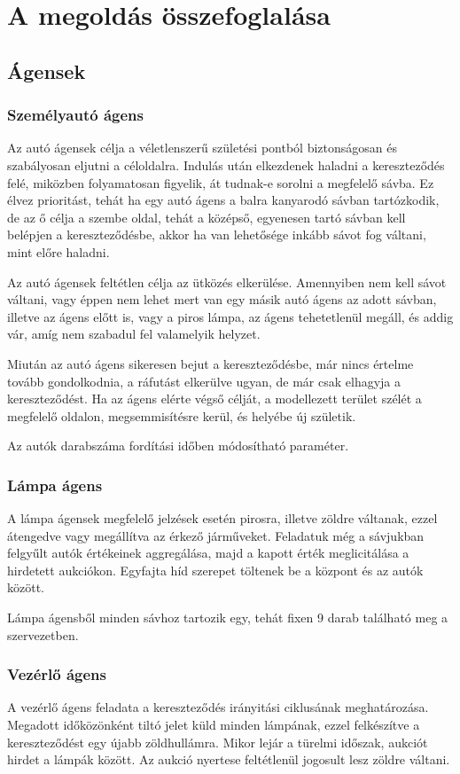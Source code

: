 \documentclass[a4paper, 11pt]{article}
\begin{document}
\section{A megoldás összefoglalása}
\subsection{Ágensek}
\subsubsection{Személyautó ágens}
Az autó ágensek célja a véletlenszerű születési pontból biztonságosan és szabályosan eljutni a céloldalra.
Indulás után elkezdenek haladni a kereszteződés felé, miközben folyamatosan figyelik, át tudnak-e sorolni
a megfelelő sávba. Ez élvez prioritást, tehát ha egy autó ágens a balra kanyarodó sávban tartózkodik, de
az ő célja a szembe oldal, tehát a középső, egyenesen tartó sávban kell belépjen a kereszteződésbe, akkor
ha van lehetősége inkább sávot fog váltani, mint előre haladni.

Az autó ágensek feltétlen célja az ütközés elkerülése. Amennyiben nem kell sávot váltani, vagy éppen nem
lehet mert van egy másik autó ágens az adott sávban, illetve az ágens előtt is, vagy a piros lámpa, az ágens
tehetetlenül megáll, és addig vár, amíg nem szabadul fel valamelyik helyzet.

Miután az autó ágens sikeresen
bejut a kereszteződésbe, már nincs értelme tovább gondolkodnia, a ráfutást elkerülve ugyan, de már csak 
elhagyja a kereszteződést. Ha az ágens elérte végső célját, a modellezett terület szélét a megfelelő oldalon,
megsemmisítésre kerül, és helyébe új születik.

Az autók darabszáma fordítási időben módosítható paraméter.
	
\subsubsection{Lámpa ágens}
A lámpa ágensek megfelelő jelzések esetén pirosra, illetve zöldre váltanak, ezzel átengedve vagy megállítva az érkező járműveket.
Feladatuk még a sávjukban felgyűlt autók értékeinek aggregálása, majd a kapott érték meglicitálása a 
hirdetett aukciókon. Egyfajta híd szerepet töltenek be a központ és az autók között.

Lámpa ágensből minden sávhoz tartozik egy, tehát fixen 9 darab található meg a szervezetben.
\subsubsection{Vezérlő ágens}
A vezérlő ágens feladata a kereszteződés irányitási ciklusának meghatározása. Megadott időközönként
tiltó jelet küld minden lámpának, ezzel felkészítve a kereszteződést egy újabb zöldhullámra.
Mikor lejár a türelmi időszak, aukciót hirdet a lámpák között. Az aukció nyertese feltétlenül jogosult
lesz zöldre váltani.
\end{document}
